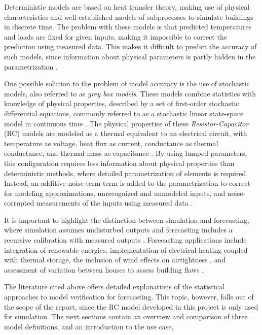 Deterministic models are based on heat transfer theory, making use of physical characteristics and well-established models of subprocesses to simulate buildings in discrete time. The problem with these models is that predicted temperatures and loads are fixed for given inputs, making it impossible to correct the prediction using measured data. This makes it difficult to predict the accuracy of such models, since information about physical parameters is partly hidden in the parametrization \cite{madsen1995estimation}.\par

One possible solution to the problem of model accuracy is the use of stochastic models, also referred to as \textit{grey box models}. These models combine statistics with knowledge of physical properties, described by a set of first-order stochastic differential equations, commonly referred to as a stochastic linear state-space model in continuous time \cite{bacher2011identifying}. The physical properties of these \textit{Resistor-Capacitor} (RC) models are modeled as a thermal equivalent to an electrical circuit, with temperature as voltage, heat flux as current, conductance as thermal conductance, and thermal mass as capacitance \cite{sonderegger2010diagnostic}. By using lumped parameters, this configuration requires less information about physical properties than deterministic methods, where detailed parametrization of elements is required. Instead, an additive noise term term is added to the parametrization to correct for modeling approximations, unrecognized and unmodeled inputs, and noise-corrupted measurements of the inputs using measured data \cite{madsen1995estimation}.\par

It is important to highlight the distinction between simulation and forecasting, where simulation assumes undisturbed outputs and forecasting includes a recursive calibration with measured outputs \cite{mejri2011energy}. Forecasting applications include integration of renewable energies, implementation of electrical heating coupled with thermal storage, the inclusion of wind effects on airtightness \cite{bacher2011identifying}, and assessment of variation between houses to assess building flaws \cite{sonderegger2010diagnostic}.\par 

The literature cited above offers detailed explanations of the statistical approaches to model verification for forecasting. This topic, however, falls out of the scope of the report, since the RC model developed in this project is only used for simulation. The next sections contain an overview and comparison of three model definitions, and an introduction to the use case.

